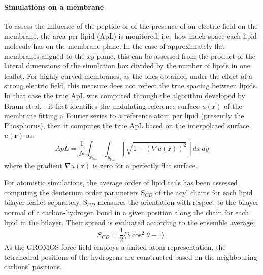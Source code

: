 \paragraph{Simulations on a membrane}
To assess the influence of the peptide or of the presence of an electric field on the membrane, the area per lipid (ApL) is monitored, i.e.\ how much space each lipid molecule has on the membrane plane. In the case of approximately flat membranes aligned to the $xy$ plane, this can be assessed from the product of the lateral dimensions of the simulation box divided by the number of lipids in one leaflet.
%
For highly curved membranes, as the ones obtained under the effect of a strong electric field, this measure does not reflect the true spacing between lipids. In that case the true ApL was computed through the algorithm developed by Braun et al. \cite{Braun2011}: it first identifies the undulating reference surface $u(\textbf{r})$ of the membrane fitting a Fourier series to a reference atom per lipid (presently the Phosphorus), then it computes the true ApL based on the interpolated surface $u(\textbf{r})$ as:
\begin{equation}
ApL = \frac{1}{N} \int_{x_{box}} \int_{y_{box}} \left[ \sqrt{1 + \left( \nabla u(\textbf{r}) \right)^2} \, \right] dx\,dy
\end{equation}
where the gradient $\nabla u(\textbf{r})$ is zero for a perfectly flat surface.

For atomistic simulations, the average order of lipid tails has been assessed computing the deuterium order parameters S$_{CD}$ of the acyl chains for each lipid bilayer leaflet separately. S$_{CD}$ measures the orientation with respect to the bilayer normal of a carbon-hydrogen bond in a given position along the chain for each lipid in the bilayer. Their spread is evaluated according to the ensemble average:
\begin{equation}
S_{CD} = \frac{1}{2} \langle 3\cos^2 \theta - 1 \rangle.
\end{equation}
As the GROMOS force field employs a united-atom representation, the tetrahedral positions of the hydrogens are constructed based on the neighbouring carbons’ positions.

